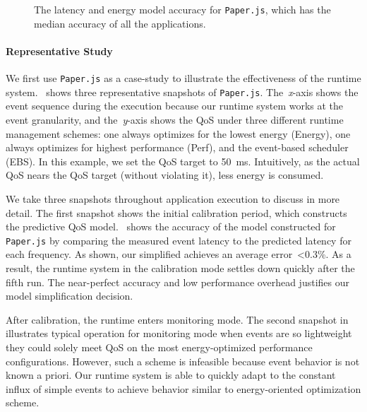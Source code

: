 \begin{figure}[t]
        \caption{\small The latency and energy model accuracy for \texttt{Paper.js}, which has the median accuracy of all the applications.}
        \label{fig:model_pred}
\end{figure}

\paragraph{Representative Study} We first use \texttt{Paper.js} as a case-study to illustrate the effectiveness of the runtime system.~ shows three representative snapshots of \texttt{Paper.js}. The~\textit{x}-axis shows the event sequence during the execution because our runtime system works at the event granularity, and the~\textit{y}-axis shows the QoS under three different runtime management schemes: one always optimizes for the lowest energy (Energy), one always optimizes for highest performance (Perf), and the event-based scheduler (EBS). In this example, we set the QoS target to 50~ms. Intuitively, as the actual QoS nears the QoS target (without violating it), less energy is consumed.

We take three snapshots throughout application execution to discuss in more detail. The first snapshot shows the initial calibration period, which constructs the predictive QoS model.~ shows the accuracy of the model constructed for \texttt{Paper.js} by comparing the measured event latency to the predicted latency for each frequency. As shown, our simplified achieves an average error~\textless 0.3\%. As a result, the runtime system in the calibration mode settles down quickly after the fifth run. The near-perfect accuracy and low performance overhead justifies our model simplification decision.

After calibration, the runtime enters monitoring mode. The second snapshot in~ illustrates typical operation for monitoring mode when events are so lightweight they could solely meet QoS on the most energy-optimized performance configurations. However, such a scheme is infeasible because event behavior is not known a priori. Our runtime system is able to quickly adapt to the constant influx of simple events to achieve behavior similar to energy-oriented optimization scheme.

